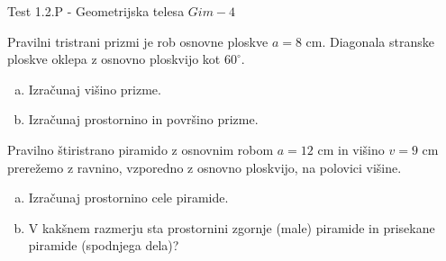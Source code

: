 \documentclass[a4paper,12pt]{letter}
\renewcommand{\headrulewidth}{3pt}
\renewcommand{\headrulewidth}{0.3pt}
\newcounter{tocke}
\begin{document}
\pagestyle{fancy}
\renewcommand\headrulewidth{0pt}
\lhead{}\chead{}\rhead{}
\rfoot{\vspace*{-2\baselineskip}}
\renewcommand{\vec}{\overrightarrow}
\def\programletnik{Gim - 4}
\def\naslov{Test 1.2.P - }
\def\sklop{Geometrijska telesa}
\def\tockeA{4+5}
\def\tockeB{3+5}
\def\tockeC{4+4}
\def\tockeD{4+3}
\begin{minipage}{20cm}
\begin{bclogo}[couleur=brown!30,
  arrondi=0,ombre=true, couleurOmbre=gray!50,
logo =\bcplume,
  noborder=true]
{\textrm{{\Large{\naslov \sklop} \Huge{}
\large{} \hfill $\programletnik$}}}
\end{bclogo}
\end{minipage}
\begin{minipage}{20cm}
\begin{bclogo}[couleur=brown!30,
  arrondi=0,ombre=true, couleurOmbre=gray!50,
logo =\bcplume,
  noborder=true]
{\textrm{{}}}
\end{bclogo}
\end{minipage}

\begin{naloga}[\hfill $\tockeA$] \addtocounter{tocke}{\numexpr\tockeA\relax}
Pravilni tristrani prizmi je rob osnovne ploskve $a=8$ cm. Diagonala stranske ploskve oklepa z osnovno ploskvijo kot $60^{\circ}$.
\begin{enumerate}[a)]
\item Izra\v{c}unaj vi\v{s}ino prizme.
\item Izra\v{c}unaj prostornino in povr\v{s}ino prizme.
\end{enumerate}
\end{naloga}\newpage

\begin{naloga}[\hfill $\tockeB$] \addtocounter{tocke}{\numexpr\tockeB\relax}
Pravilno \v{s}tiristrano piramido z osnovnim robom $a=12$ cm in vi\v{s}ino $v=9$ cm prere\v{z}emo z ravnino, vzporedno z osnovno ploskvijo, na polovici vi\v{s}ine.
\begin{enumerate}[a)]
\item Izra\v{c}unaj prostornino cele piramide.
\item V kak\v{s}nem razmerju sta prostornini zgornje (male) piramide in prisekane piramide (spodnjega dela)?
\end{enumerate}
\end{naloga}\newpage
\end{document}
